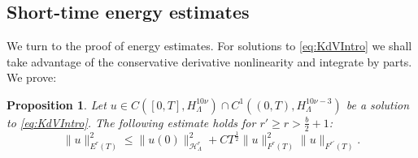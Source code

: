 \documentclass{amsart}
\newtheorem{proposition}[theorem]{Proposition}
\theoremstyle{definition}
\begin{document}
\subsection{Short-time energy estimates}

We turn to the proof of energy estimates. For solutions to \eqref{eq:KdVIntro} we shall take advantage of the conservative derivative nonlinearity and integrate by parts. We prove:
\begin{proposition}
\label{prop:EnergyEstimates}
Let $u \in C([0,T],H^{10\nu}_\Lambda) \cap C^1((0,T),H^{10 \nu-3}_{\Lambda})$ be a solution to \eqref{eq:KdVIntro}. The following estimate holds for $r' \geq r > \frac{b}{2} + 1$:
\begin{equation}
\label{eq:EnergyEstimateSolution}
\| u \|^2_{E^r(T)} \leq \| u(0) \|^2_{\mathcal{H}^r_\Lambda} + C T^{\frac{1}{2}} \|u \|^2_{F^r(T)} \| u \|_{F^{r'}(T)}.
\end{equation}
\end{proposition}
\end{document}

